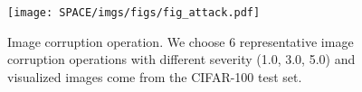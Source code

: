\begin{figure}[h]
    \centering
    \texttt{[image: SPACE/imgs/figs/fig\_attack.pdf]}
    \caption{Image corruption operation. We choose 6 representative image corruption operations with different severity (1.0, 3.0, 5.0) and visualized images come from the CIFAR-100 test set.
    }
    \label{fig: attack}
\end{figure}